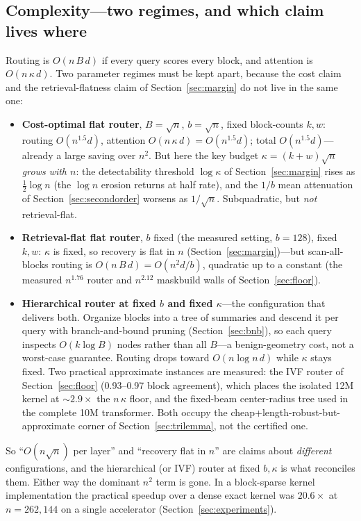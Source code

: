 \documentclass[11pt]{article}
\numberwithin{equation}{section}
\begin{document}
\subsection{Complexity---two regimes, and which claim lives where}\label{sec:complexity}

Routing is $O(n\,B\,d)$ if every query scores every block, and attention is $O(n\,\kappa\,d)$. Two parameter
regimes must be kept apart, because the cost claim and the retrieval-flatness claim of
Section~\ref{sec:margin} do not live in the same one:
\begin{itemize}
\item \textbf{Cost-optimal flat router}, $B=\sqrt n$, $b=\sqrt n$, fixed block-counts $k,w$: routing
  $O(n^{1.5}d)$, attention $O(n\,\kappa\,d)=O(n^{1.5}d)$; total $O(n^{1.5}d)$---already a large saving over
  $n^2$. But here the key budget $\kappa=(k+w)\sqrt n$ \emph{grows with $n$}: the detectability threshold
  $\log\kappa$ of Section~\ref{sec:margin} rises as $\tfrac12\log n$ (the $\log n$ erosion returns at half
  rate), and the $1/b$ mean attenuation of Section~\ref{sec:secondorder} worsens as $1/\sqrt n$.
  Subquadratic, but \emph{not} retrieval-flat.
\item \textbf{Retrieval-flat flat router}, $b$ fixed (the measured setting, $b=128$), fixed $k,w$: $\kappa$
  is fixed, so recovery is flat in $n$ (Section~\ref{sec:margin})---but scan-all-blocks routing is
  $O(n\,B\,d)=O(n^2d/b)$, quadratic up to a constant (the measured $n^{1.76}$ router and $n^{2.12}$
  maskbuild walls of Section~\ref{sec:floor}).
\item \textbf{Hierarchical router at fixed $b$ and fixed $\kappa$}---the configuration that delivers both.
  Organize blocks into a tree of summaries and descend it per query with branch-and-bound pruning
  (Section~\ref{sec:bnb}), so each query inspects $O(k\log B)$ nodes rather than all $B$---a benign-geometry
  cost, not a worst-case guarantee. Routing drops toward $O(n\log n\,d)$ while $\kappa$ stays fixed. Two
  practical approximate instances are measured: the IVF router of Section~\ref{sec:floor} (0.93--0.97 block
  agreement), which places the isolated 12M kernel at ${\sim}2.9\times$ the $n\,\kappa$ floor, and the
  fixed-beam center-radius tree used in the complete 10M transformer. Both occupy the
  cheap+length-robust-but-approximate corner of Section~\ref{sec:trilemma}, not the certified one.
\end{itemize}
So ``$O(n\sqrt n)$ per layer'' and ``recovery flat in $n$'' are claims about \emph{different} configurations,
and the hierarchical (or IVF) router at fixed $b,\kappa$ is what reconciles them. Either way the dominant
$n^2$ term is gone. In a block-sparse kernel implementation the practical speedup over
a dense exact kernel was $20.6\times$ at $n=262{,}144$ on a single accelerator (Section~\ref{sec:experiments}).
\end{document}
